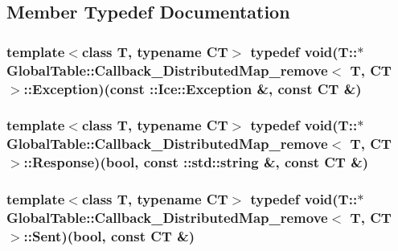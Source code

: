 \subsection{Member Typedef Documentation}
\hypertarget{class_global_table_1_1_callback___distributed_map__remove_a41f61bd2c451c6b36b1180b0a728d1a9}{
\subsubsection[{Exception}]{\setlength{\rightskip}{0pt plus 5cm}template$<$class T, typename CT$>$ typedef void(T::$\ast$ {\bf GlobalTable::Callback\_\-DistributedMap\_\-remove}$<$ T, CT $>$::{\bf Exception})(const ::Ice::Exception \&, const CT \&)}}
\label{class_global_table_1_1_callback___distributed_map__remove_a41f61bd2c451c6b36b1180b0a728d1a9}
\hypertarget{class_global_table_1_1_callback___distributed_map__remove_a688f2491241f9e271cd69a42337257ee}{
\subsubsection[{Response}]{\setlength{\rightskip}{0pt plus 5cm}template$<$class T, typename CT$>$ typedef void(T::$\ast$ {\bf GlobalTable::Callback\_\-DistributedMap\_\-remove}$<$ T, CT $>$::{\bf Response})(bool, const ::std::string \&, const CT \&)}}
\label{class_global_table_1_1_callback___distributed_map__remove_a688f2491241f9e271cd69a42337257ee}
\hypertarget{class_global_table_1_1_callback___distributed_map__remove_a4f807ae9e10f4f3fe1b7f7f677bb5379}{
\subsubsection[{Sent}]{\setlength{\rightskip}{0pt plus 5cm}template$<$class T, typename CT$>$ typedef void(T::$\ast$ {\bf GlobalTable::Callback\_\-DistributedMap\_\-remove}$<$ T, CT $>$::{\bf Sent})(bool, const CT \&)}}
